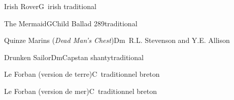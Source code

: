 \begin{song}{Irish Rover}{G}{~}{irish traditional}{}{}
	
\end{song}

\begin{song}{The Mermaid}{G}{Child Ballad 289}{traditional}{}{}
	
\end{song}

\begin{song}{Quinze Marins (\textit{Dead Man's Chest})}{Dm}{~}{R.L. Stevenson and Y.E. Allison}{}{}
	
\end{song}

\begin{song}{Drunken Sailor}{Dm}{Capstan shanty}{traditional}{}{}
	
\end{song}

\begin{song}{Le Forban (version de terre)}{C}{~}{traditionnel breton}{}{}
	
\end{song}
	
\begin{song}{Le Forban (version de mer)}{C}{~}{traditionnel breton}{}{}
	
\end{song}


